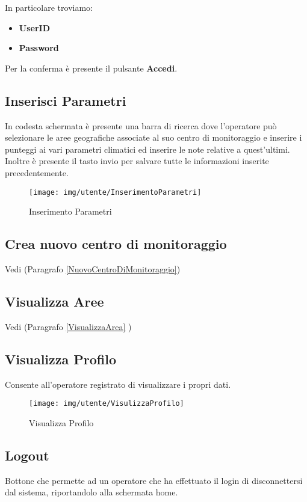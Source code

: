 In particolare troviamo:
\begin{itemize}
	\item \textbf{UserID} 
	\item \textbf{Password}
\end{itemize} 

Per la conferma è presente il pulsante \textbf{Accedi}.

\pagebreak
\subsection{Inserisci Parametri}
In codesta schermata è presente una barra di ricerca dove l'operatore può selezionare le aree geografiche associate al suo centro di monitoraggio e inserire i punteggi ai vari parametri climatici ed inserire le note relative a quest'ultimi.
Inoltre è presente il tasto invio per salvare tutte le informazioni inserite precedentemente.

\begin{figure}[h]
	\centering
	\texttt{[image: img/utente/InserimentoParametri]}
	\caption{Inserimento Parametri}
	\label{fig:inserimentoparametri}
\end{figure}


\subsection{Crea nuovo centro di monitoraggio}
Vedi (Paragrafo \ref{NuovoCentroDiMonitoraggio})
\subsection{Visualizza Aree}
Vedi (Paragrafo \ref{VisualizzaArea} )

\pagebreak
\subsection{Visualizza Profilo} \label{Profilo}
Consente all'operatore registrato di visualizzare i propri dati.

\begin{figure}[h]
	\centering
	\texttt{[image: img/utente/VisulizzaProfilo]}
	\caption{Visualizza Profilo}
	\label{fig:visulizzaprofilo}
\end{figure}

\subsection{Logout}
Bottone che permette ad un operatore che ha effettuato il login di disconnettersi dal sistema, riportandolo alla schermata home. 

